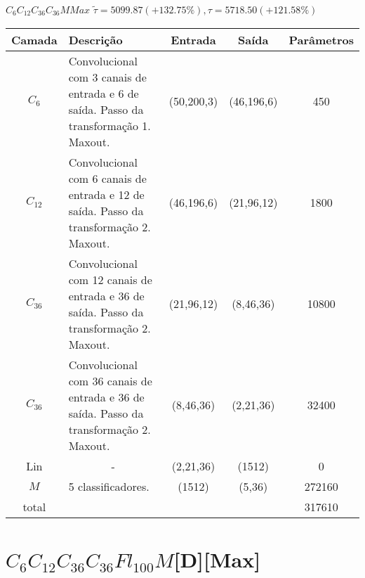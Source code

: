 \begin{tiny}
\begin{table}[H]
	$C_6C_{12}C_{36}C_{36}MMax$ $\tilde{\tau}=5099.87 (+132.75\%), \tau=5718.50 (+121.58\%)$\newline
	\begin{tabularx}{\linewidth}{ |c|X|c|c|c| }
		\hline
		Camada & Descrição & Entrada & Saída & Parâmetros \\ \hline
		$C_{6}$ & Convolucional com 3 canais de entrada e 6 de saída. Passo da transformação 1. Maxout. & (50,200,3) & (46,196,6) & 450 \\ \hline
		$C_{12}$ & Convolucional com 6 canais de entrada e 12 de saída. Passo da transformação 2. Maxout. & (46,196,6) & (21,96,12) & 1800 \\ \hline
		$C_{36}$ & Convolucional com 12 canais de entrada e 36 de saída. Passo da transformação 2. Maxout. & (21,96,12) & (8,46,36) & 10800 \\ \hline
		$C_{36}$ & Convolucional com 36 canais de entrada e 36 de saída. Passo da transformação 2. Maxout. & (8,46,36) & (2,21,36) & 32400 \\ \hline
		Lin & \multicolumn{1}{c|}{-} & (2,21,36) & (1512) & 0 \\ \hline
		$M$ & 5 classificadores. & (1512) & (5,36) & 272160 \\ \hline
		total &  &  &  & 317610 \\ \hline
	\end{tabularx}
\end{table}

\section*{$C_6C_{12}C_{36}C_{36}Fl_{100}M$[D][Max]}


\end{tiny}

